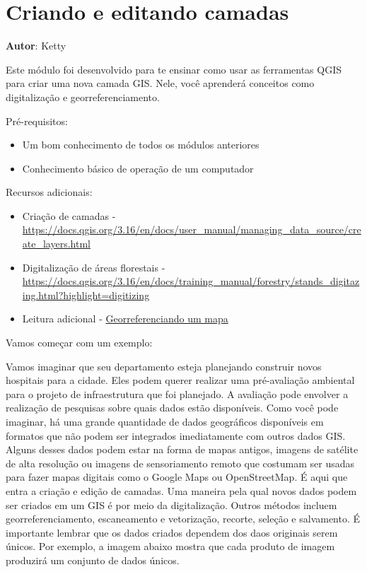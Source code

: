 \documentclass[
]{krantz}
\providecommand{\tightlist}{%
  \setlength{\itemsep}{0pt}\setlength{\parskip}{0pt}}
\begin{document}
\hypertarget{criando-e-editando-camadas}{%
\chapter{Criando e editando camadas}\label{criando-e-editando-camadas}}

\textbf{Autor}: Ketty

Este módulo foi desenvolvido para te ensinar como usar as ferramentas QGIS para criar uma nova camada GIS. Nele, você aprenderá conceitos como digitalização e georreferenciamento.

Pré-requisitos:

\begin{itemize}
\tightlist
\item
  Um bom conhecimento de todos os módulos anteriores
\item
  Conhecimento básico de operação de um computador
\end{itemize}

Recursos adicionais:

\begin{itemize}
\tightlist
\item
  Criação de camadas - \url{https://docs.qgis.org/3.16/en/docs/user_manual/managing_data_source/create_layers.html}
\item
  Digitalização de áreas florestais - \href{https://docs.\%20qgis.org/3.16/en/docs/training_manual/forestry/stands_digitazing.html?highlight=digitizing}{https://docs.qgis.org/3.16/en/docs/training\_manual/forestry/stands\_digitazing.html?highlight=digitizing}
\item
  Leitura adicional - \href{https://docs.qgis.org/3.16/en/docs/training_manual/forestry/map_georeferencing.html?highlight=georeferencing}{Georreferenciando um mapa}
\end{itemize}

Vamos começar com um exemplo:

Vamos imaginar que seu departamento esteja planejando construir novos hospitais para a cidade. Eles podem querer realizar uma pré-avaliação ambiental para o projeto de infraestrutura que foi planejado. A avaliação pode envolver a realização de pesquisas sobre quais dados estão disponíveis. Como você pode imaginar, há uma grande quantidade de dados geográficos disponíveis em formatos que não podem ser integrados imediatamente com outros dados GIS. Alguns desses dados podem estar na forma de mapas antigos, imagens de satélite de alta resolução ou imagens de sensoriamento remoto que costumam ser usadas para fazer mapas digitais como o Google Maps ou OpenStreetMap. É aqui que entra a criação e edição de camadas. Uma maneira pela qual novos dados podem ser criados em um GIS é por meio da digitalização. Outros métodos incluem georreferenciamento, escaneamento e vetorização, recorte, seleção e salvamento. É importante lembrar que os dados criados dependem dos daos originais serem únicos. Por exemplo, a imagem abaixo mostra que cada produto de imagem produzirá um conjunto de dados únicos.
\end{document}
